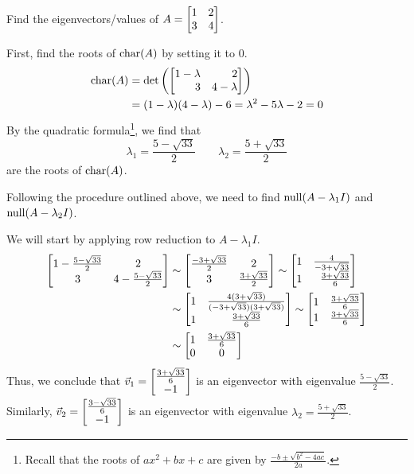 \begin{example}
	Find the eigenvectors/values of $A=\mat{1&2\\3&4}$.

	First, find the roots of $\operatorname{char}(A)$ by setting it to $0$.
	\begin{align*}
	    \Char(A)&=\det\left(\mat{1-\lambda&2\\3&4-\lambda}\right)\\
	            &=(1-\lambda)(4-\lambda)-6=\lambda^2-5\lambda-2=0
	\end{align*}
	By the quadratic formula\footnote{ Recall that the
	roots of $ax^2+bx+c$ are given by $\frac{-b\pm\sqrt{b^2-4ac}}{2a}$.}, we find that
	\[\lambda_1=\frac{5-\sqrt{33}}{2}\qquad\lambda_2=\frac{5+\sqrt{33}}{2}\]
	are the roots of $\operatorname{char}(A)$.
	
	
	Following the procedure outlined above, we need to
	find $\operatorname{null}(A-\lambda_1I)$ and $\operatorname{null}(A-\lambda_2I)$.
	
	We will start by applying row reduction to $A-\lambda_1I$.
	\begin{align*}
	    \matc{1-\frac{5-\sqrt{33}}{2}&2\\3&4-\frac{5-\sqrt{33}}{2}} & \sim
	    \matc{\frac{-3+\sqrt{33}}{2}&2\\3&\frac{3+\sqrt{33}}{2}} \sim \mat{1&\frac{4}{-3+\sqrt{33}}\\1&\frac{3+\sqrt{33}}{6}}\\
	    & \sim \matc{1&\frac{4(3+\sqrt{33})}{(-3+\sqrt{33})(3+\sqrt{33})}\\1&\frac{3+\sqrt{33}}{6}} \sim \mat{1&\frac{3+\sqrt{33}}{6}\\1&\frac{3+\sqrt{33}}{6}}\\
	    & \sim \matc{1&\frac{3+\sqrt{33}}{6}\\0&0}
	\end{align*}
	Thus, we conclude that $\vec v_1 = \begin{bmatrix}\frac{3+\sqrt{33}}{6}\\-1\end{bmatrix}$ is an eigenvector with eigenvalue $\frac{5-\sqrt{33}}{2}$. Similarly, $\vec v_2=\begin{bmatrix}\frac{3-\sqrt{33}}{6}\\-1\end{bmatrix}$ is an eigenvector with eigenvalue $\lambda_2 = \frac{5+\sqrt{33}}{2}$.
\end{example}

